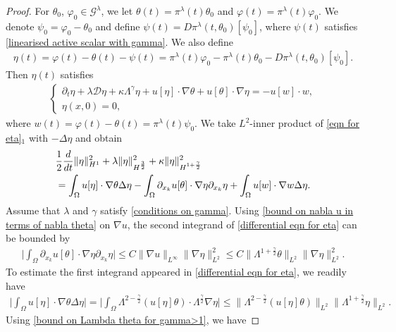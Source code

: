 \documentclass[reqno]{amsart}%
\theoremstyle{definition}
\theoremstyle{remark}
\numberwithin{equation}{section}
\newcommand{\dt}{\partial_t}
\newcommand{\1}{\mathbf{1}}
\newcommand{\Gg}{\mathcal{G}^{\lambda}}
\newcommand{\pin}{\pi^{\lambda}}
\newcommand{\intox}{\int_{\Omega}}
\numberwithin{equation}{section}
\numberwithin{theorem}{section}
\numberwithin{figure}{section}
\begin{document}
\begin{proof}
For $\theta_0$, $\varphi_0\in\Gg$, we let $\theta(t)=\pin(t)\theta_0$ and $\varphi(t)=\pin(t)\varphi_0$. We denote $\psi_0=\varphi_0-\theta_0$ and define $\psi(t)=D\pin(t, \theta_0)[\psi_0]$, where $\psi(t)$ satisfies \eqref{linearised active scalar with gamma}. We also define 
\begin{align*}
\eta(t)=\varphi(t)-\theta(t)-\psi(t)=\pin(t)\varphi_0-\pin(t)\theta_0-D\pin(t, \theta_0)[\psi_0].
\end{align*}
Then $\eta(t)$ satisfies
\begin{align}\label{eqn for eta}
\left\{ \begin{array}{l}
\dt\eta+\lambda\mathcal{D}\eta+\kappa\Lambda^\gamma\eta+u[\eta]\cdot\nabla\theta+u[\theta]\cdot\nabla\eta=-u[w]\cdot w, \\
\eta(x,0)=0,
\end{array}\right.
\end{align}
where $w(t)=\varphi(t)-\theta(t)=\pin(t)\psi_0$. We take $L^2$-inner product of \eqref{eqn for eta}$_1$ with $-\Delta\eta$ and obtain
\begin{align}\label{differential eqn for eta}
&\frac{1}{2}\frac{d}{dt}\|\eta\|^2_{H^1}+\lambda\|\eta\|^2_{H^{\frac{3}{2}}}+\kappa\|\eta\|^2_{H^{1+\frac{\gamma}{2}}}\notag\\
&=\intox u[\eta]\cdot\nabla\theta\Delta\eta-\intox\partial_{x_k}u[\theta]\cdot\nabla\eta\partial_{x_k}\eta+\intox u[w]\cdot\nabla w\Delta\eta.
\end{align}
Assume that $\lambda$ and $\gamma$ satisfy \eqref{conditions on gamma}. Using \eqref{bound on nabla u in terms of nabla theta} on $\nabla u$, the second integrand of \eqref{differential eqn for eta} can be bounded by 
\begin{align*}
\Big|\intox\partial_{x_k}u[\theta]\cdot\nabla\eta\partial_{x_k}\eta\Big|\le C\|\nabla u\|_{L^\infty}\|\nabla\eta\|^2_{L^2}\le C\|\Lambda^{1+\frac{\gamma}{2}}\theta\|_{L^2}\|\nabla\eta\|^2_{L^2}.
\end{align*}
To estimate the first integrand appeared in \eqref{differential eqn for eta}, we readily have
\begin{align*}
\Big|\intox u[\eta]\cdot\nabla\theta\Delta\eta\Big|=\Big|\intox\Lambda^{2-\frac{\gamma}{2}}(u[\eta]\theta)\cdot\Lambda^\frac{\gamma}{2}\nabla\eta\Big|\le \|\Lambda^{2-\frac{\gamma}{2}}(u[\eta]\theta)\|_{L^2}\|\Lambda^{1+\frac{\gamma}{2}}\eta\|_{L^2}.
\end{align*} 
Using \eqref{bound on Lambda theta for gamma>1}, we have

\end{proof}
\end{document}
